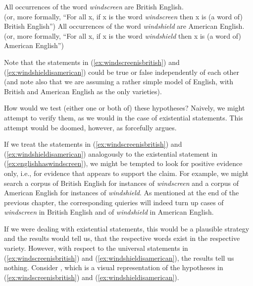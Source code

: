 \begin{exe}
\ex All occurrences of the word \textit{windscreen} are British  English. \\
(or, more formally, ``For all x, if x is the word \textit{windscreen} then x is (a word of) British English'')
\label{ex:windscreenisbritish}
\ex All occurrences of the word \textit{windshield} are American  English.\\
(or, more formally, ``For all x, if x is the word \textit{windshield} then x is (a word of) American English'')
\label{ex:windshieldisamerican}
\end{exe}

Note that the statements in (\ref{ex:windscreenisbritish}) and (\ref{ex:windshieldisamerican}) could be true or false independently of each other (and note also that we are assuming a rather simple model of English, with British  and American  English as the only  varieties).

How would we test (either one or both of) these hypotheses?  Naively, we might attempt to verify them, as we would in the case of existential statements. This attempt would be doomed, however, as \citet{popper_conjectures_1963} forcefully argues.

If we treat the statements in (\ref{ex:windscreenisbritish}) and (\ref{ex:windshieldisamerican}) analogously to the existential statement in (\ref{ex:englishhaswindscreen}), we might be tempted to look for positive evidence only, i.e., for evidence that appears to support the claim. For example, we might search a corpus of British  English for instances of \textit{windscreen} and a corpus of American  English for instances of \textit{windshield}. As mentioned at the end of the previous chapter, the corresponding quieries will indeed turn up cases of \textit{windscreen} in British  English and of \textit{windshield} in American  English.

If we were dealing with existential statements, this would be a plausible strategy and the results would tell us, that the respective words exist in the respective variety.  However, with respect to the universal statements in (\ref{ex:windscreenisbritish}) and (\ref{ex:windshieldisamerican}), the results tell us nothing. Consider , which is a visual representation of the hypotheses in (\ref{ex:windscreenisbritish}) and (\ref{ex:windshieldisamerican}).

